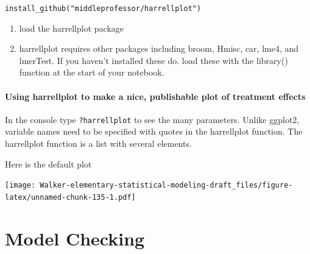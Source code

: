 \documentclass[]{book}
\newenvironment{Shaded}{\begin{snugshade}}{\end{snugshade}}
\newcommand{\CommentTok}[1]{\textcolor[rgb]{0.56,0.35,0.01}{\textit{#1}}}
\newcommand{\DataTypeTok}[1]{\textcolor[rgb]{0.13,0.29,0.53}{#1}}
\newcommand{\KeywordTok}[1]{\textcolor[rgb]{0.13,0.29,0.53}{\textbf{#1}}}
\newcommand{\NormalTok}[1]{#1}
\newcommand{\OperatorTok}[1]{\textcolor[rgb]{0.81,0.36,0.00}{\textbf{#1}}}
\newcommand{\StringTok}[1]{\textcolor[rgb]{0.31,0.60,0.02}{#1}}
\providecommand{\tightlist}{%
  \setlength{\itemsep}{0pt}\setlength{\parskip}{0pt}}
\begin{document}
\texttt{install\_github("middleprofessor/harrellplot")}

\begin{enumerate}
\def\labelenumi{\arabic{enumi}.}
\setcounter{enumi}{2}
\tightlist
\item
  load the harrellplot package
\item
  harrellplot requires other packages including broom, Hmisc, car, lme4, and lmerTest. If you haven't installed these do. load these with the library() function at the start of your notebook.
\end{enumerate}

\hypertarget{using-harrellplot-to-make-a-nice-publishable-plot-of-treatment-effects}{%
\subsubsection{Using harrellplot to make a nice, publishable plot of treatment effects}\label{using-harrellplot-to-make-a-nice-publishable-plot-of-treatment-effects}}

In the console type \texttt{?harrellplot} to see the many parameters. Unlike ggplot2, variable names need to be specified with quotes in the harrellplot function. The harrellplot function is a list with several elements.

Here is the default plot

\begin{Shaded}
\end{Shaded}

\texttt{[image: Walker-elementary-statistical-modeling-draft\_files/figure-latex/unnamed-chunk-135-1.pdf]}

\hypertarget{model-checking}{%
\chapter{Model Checking}\label{model-checking}}
\end{document}
